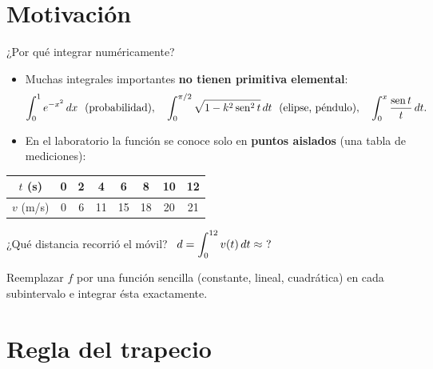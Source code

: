 \documentclass[10pt,aspectratio=169]{beamer}
\begin{document}
\section{Motivación}

\begin{frame}{¿Por qué integrar numéricamente?}
  \begin{itemize}
    \item Muchas integrales importantes \textbf{no tienen primitiva elemental}:
      \[ \int_0^1e^{-x^2}\dx\ \ \text{(probabilidad)},\quad \int_0^{\pi/2}\sqrt{1-k^2\sen^2t}\dt\ \ \text{(elipse, péndulo)},\quad \int_0^x\frac{\sen t}{t}\dt. \]
    \item En el laboratorio la función se conoce solo en \textbf{puntos aislados} (una tabla de mediciones):
  \end{itemize}
  \begin{center}
    \begin{tabular}{c|ccccccc}
      $t$ (s) & 0 & 2 & 4 & 6 & 8 & 10 & 12\\ \hline
      $v$ (m/s) & 0 & 6 & 11 & 15 & 18 & 20 & 21
    \end{tabular}
  \end{center}
  \quad ¿Qué distancia recorrió el móvil? \ $\displaystyle d=\int_0^{12}v(t)\dt\approx\ ?$
  \begin{idea}
    Reemplazar $f$ por una función sencilla (constante, lineal, cuadrática) en cada subintervalo e integrar ésta exactamente.
  \end{idea}
\end{frame}

\section{Regla del trapecio}
\end{document}
